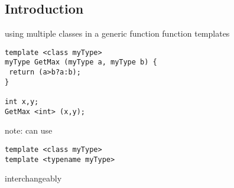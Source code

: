 
\subsection{Introduction}


using multiple classes in a generic function
function templates


\begin{verbatim}
template <class myType>
myType GetMax (myType a, myType b) {
 return (a>b?a:b);
}

int x,y;
GetMax <int> (x,y);
\end{verbatim}

note: can use

\begin{verbatim}
template <class myType>
template <typename myType>
\end{verbatim}
interchangeably
